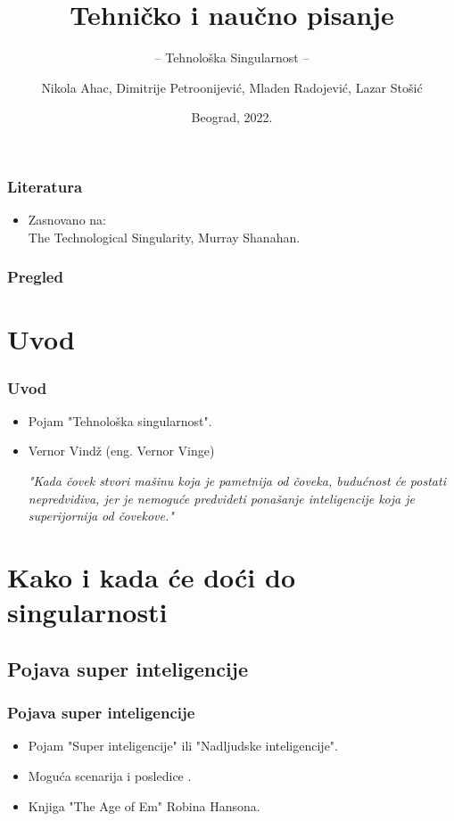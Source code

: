 \documentclass{beamer}
\title{Tehničko i naučno pisanje}
\subtitle{-- Tehnološka Singularnost --}
\author{Nikola Ahac, Dimitrije Petroonijević, Mladen Radojević, Lazar Stošić}
\institute{Matematički fakultet\\Univerzitet u Beogradu}
\date{
	\footnotesize{Beograd, 2022.}	
}
\begin{document}
\begin{frame}
	\thispagestyle{empty}
	\titlepage
\end{frame}

\addtocounter{framenumber}{-1}

\begin{frame}[fragile]\frametitle{Literatura}
	\begin{itemize}
		\item Zasnovano na:\\
		The Technological Singularity, Murray Shanahan.
	\end{itemize}
\end{frame}

\begin{frame}
	\frametitle{Pregled} %
	\tableofcontents[hidesubsections] 
\end{frame}
\section{Uvod}

\begin{frame}[fragile]\frametitle{Uvod}
	\begin{itemize}	
		\item Pojam "Tehnološka singularnost".
		\item Vernor Vindž (eng. Vernor Vinge)
              
              \emph {"Kada čovek stvori mašinu koja je pametnija od čoveka, budućnost će postati nepredvidiva, jer je nemoguće predvideti ponašanje inteligencije koja je superijornija od čovekove."}

	\end{itemize}
\end{frame}

\section{Kako i kada će doći do singularnosti}
\subsection{Pojava super inteligencije}
\begin{frame}[fragile]\frametitle{Pojava super inteligencije}
	\begin{itemize}	
		\item Pojam "Super inteligencije" ili "Nadljudske inteligencije".
        \item Moguća scenarija i posledice .
        \item Knjiga "The Age of Em" Robina Hansona.
	\end{itemize}
\end{frame}
\end{document}
